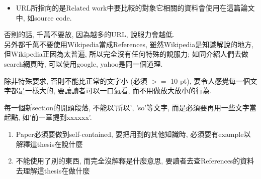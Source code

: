 \begin{enumerate}
{\begin{itemize}
{\begin{itemize}
          \item
          {
            URL所指向的是Related work中要比較的對象它相關的資料會使用在這篇論文中, 如source code.
          } %
        \end{itemize}

        否則的話, 千萬不要放, 因為越多的URL, 說服力會越低.\\
 
        另外都千萬不要使用Wikipedia當成References, 雖然Wikipedia是知識解說的地方, 但Wikipedia正因為太普遍, 所以完全沒有任何特殊的說服力; 如同介紹人們去做search網頁時, 可以使用google, yahoo是同一個道理.
      } %
    \end{itemize}
  } %
\end{enumerate}


除非特殊要求, 否則不能比正常的文字小 (必須 $ >= $ 10 pt), 要令人感覺每一個文字都是一樣大的, 要讓讀者可以一口氣看, 而不用做放大放小的行為.


每一個新section的開頭段落, 不能以'所以', 'so'等文字, 而是必須要再用一些文字當起點, 如'前一章提到xxxxxx'.


\begin{enumerate}
  \item
  {
    Paper必須要做到self-contained, 要把用到的其他知識時, 必須要有example以解釋這thesis在說什麼
  } %

  \item
  {
    不能使用了別的東西, 而完全沒解釋是什麼意思, 要讀者去查References的資料去理解這thesis在做什麼
  } %
\end{enumerate}


